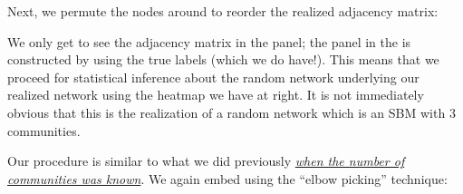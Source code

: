 \documentclass[letterpaper,10pt,english]{jupyterBook}
\begin{document}
\noindent{}

\sphinxAtStartPar
Next, we permute the nodes around to reorder the realized adjacency matrix:

\begin{sphinxVerbatim}[commandchars=\\\{\}]
  \PYG{p}{[}\PYG{p}{]} \PYG{p}{[}\PYG{p}{]} 

  \PYG{p}{[}\PYG{p}{[}\PYG{p}{]}\PYG{p}{]} \PYG{p}{[}\PYG{p}{]}
  \PYG{p}{[}\PYG{p}{]}
\end{sphinxVerbatim}

\noindent{}

\sphinxAtStartPar
We only get to see the adjacency matrix in the  panel; the panel in the  is constructed by using the true labels (which we do  have!). This means that we proceed for statistical inference about the random network underlying our realized network using  the heatmap we have at right. It is not immediately obvious that this is the realization of a random network which is an SBM with \(3\) communities.

\sphinxAtStartPar
Our procedure is  similar to what we did previously {\hyperref[\detokenize{representations/ch6/estimating-parameters_spectral:link?}]{\emph{when the number of communities was known}}}. We again embed using the “elbow picking” technique:

\begin{sphinxVerbatim}[commandchars=\\\{\}]
    
  
\end{sphinxVerbatim}
\end{document}
